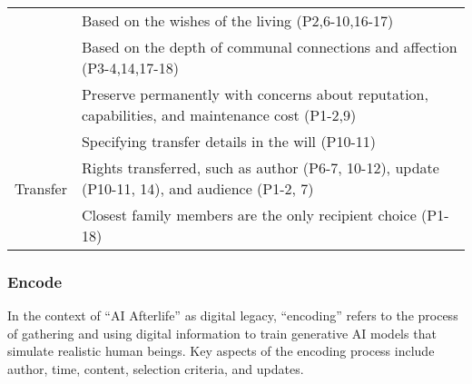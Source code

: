 \begin{table*}[htbp]
\begin{tabular}{p{}p{}}
             & \cellcolor{gray!15}Based on the wishes of the living (P2,6-10,16-17) \\ %
             & Based on the depth of communal connections and affection (P3-4,14,17-18) \\ %
             & \cellcolor{gray!15}Preserve permanently with concerns about reputation, capabilities, and maintenance cost (P1-2,9)\\
    \hline
    \multirow{3}{=}{Transfer} 
            & Specifying transfer details in the will (P10-11)  \\ %
            & \cellcolor{gray!15} Rights transferred, such as author (P6-7, 10-12), update (P10-11, 14), and audience (P1-2, 7) \\
            & Closest family members are the only recipient choice (P1-18) \\ %
    \bottomrule
  \end{tabular}
\end{table*}

\subsubsection{Encode}

In the context of ``AI Afterlife'' as digital legacy, ``encoding'' refers to the process of gathering and using digital information to train generative AI models that simulate realistic human beings. Key aspects of the encoding process include author, time, content, selection criteria, and updates.

